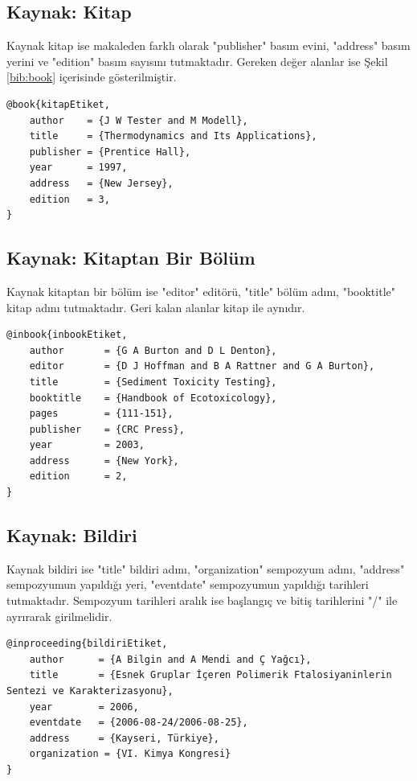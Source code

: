 \subsection{Kaynak: Kitap}

Kaynak kitap ise makaleden farklı olarak "publisher" basım evini, "address" basım yerini ve "edition" basım sayısını tutmaktadır. Gereken değer alanlar ise Şekil \ref{bib:book} içerisinde gösterilmiştir.

\begin{lstlisting}[language={[LaTeX]{TeX}}, label=bib:book, caption=Kaynak bir kitap ise]
@book{kitapEtiket,
	author    = {J W Tester and M Modell}, 
	title     = {Thermodynamics and Its Applications},
	publisher = {Prentice Hall},
	year      = 1997,
	address   = {New Jersey},
	edition   = 3,
}
\end{lstlisting}

\subsection{Kaynak: Kitaptan Bir Bölüm}

Kaynak kitaptan bir bölüm ise "editor" editörü, "title" bölüm adını, "booktitle" kitap adını tutmaktadır. Geri kalan alanlar kitap ile aynıdır. 

\begin{lstlisting}[language={[LaTeX]{TeX}}, label=bib:inbook, caption=Kaynak kitaptan bölüm ise]
@inbook{inbookEtiket,
	author       = {G A Burton and D L Denton}, 
	editor       = {D J Hoffman and B A Rattner and G A Burton},
	title 	     = {Sediment Toxicity Testing},
	booktitle    = {Handbook of Ecotoxicology},
	pages        = {111-151},
	publisher    = {CRC Press},
	year         = 2003,
	address      = {New York},
	edition      = 2,
}
\end{lstlisting}


\subsection{Kaynak: Bildiri}

Kaynak bildiri ise "title" bildiri adını, "organization" sempozyum adını, "address" sempozyumun yapıldığı yeri, "eventdate" sempozyumun yapıldığı tarihleri tutmaktadır. Sempozyum tarihleri aralık ise başlangıç ve bitiş tarihlerini "/" ile ayrırarak girilmelidir.

\begin{lstlisting}[language={[LaTeX]{TeX}}, label=bib:inproceeding, caption=Kaynak bildiri ise]
@inproceeding{bildiriEtiket,
	author 		= {A Bilgin and A Mendi and Ç Yağcı},
	title       = {Esnek Gruplar İçeren Polimerik Ftalosiyaninlerin Sentezi ve Karakterizasyonu},
	year		= 2006,
	eventdate   = {2006-08-24/2006-08-25},
	address     = {Kayseri, Türkiye},
	organization = {VI. Kimya Kongresi}
}
\end{lstlisting}


